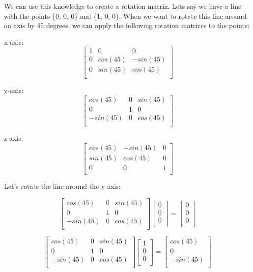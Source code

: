 \documentclass[12pt]{report} \usepackage{preamble}
\begin{document}
We can use this knowledge to create a rotation matrix. Lets say we have a line with
the points \{0, 0, 0\} and \{1, 0, 0\}.
When we want to rotate this line around an axis by 45 degrees, we can apply
the following rotation matrices to the points:

x-axis: \[
	\begin{bmatrix}
		1 & 0       & 0        \\
		0 & cos(45) & -sin(45) \\
		0 & sin(45) & cos(45)  \\
	\end{bmatrix}
\]

y-axis: \[
	\begin{bmatrix}
		cos(45)  & 0 & sin(45) \\
		0        & 1 & 0       \\
		-sin(45) & 0 & cos(45) \\
	\end{bmatrix}
\]

z-axis: \[
	\begin{bmatrix}
		cos(45) & -sin(45) & 0 \\
		sin(45) & cos(45)  & 0 \\
		0       & 0        & 1 \\
	\end{bmatrix}
\]

Let's rotate the line around the y axis:

\[
	\begin{bmatrix}
		cos(45)  & 0 & sin(45) \\
		0        & 1 & 0       \\
		-sin(45) & 0 & cos(45) \\
	\end{bmatrix}
	\begin{bmatrix}
		0 \\
		0 \\
		0 \\
	\end{bmatrix}
	=
	\begin{bmatrix}
		0 \\
		0 \\
		0 \\
	\end{bmatrix}
\]

\[
	\begin{bmatrix}
		cos(45)  & 0 & sin(45) \\
		0        & 1 & 0       \\
		-sin(45) & 0 & cos(45) \\
	\end{bmatrix}
	\begin{bmatrix}
		1 \\
		0 \\
		0 \\
	\end{bmatrix}
	=
	\begin{bmatrix}
		cos(45)  \\
		0        \\
		-sin(45) \\
	\end{bmatrix}
\]
\end{document}
